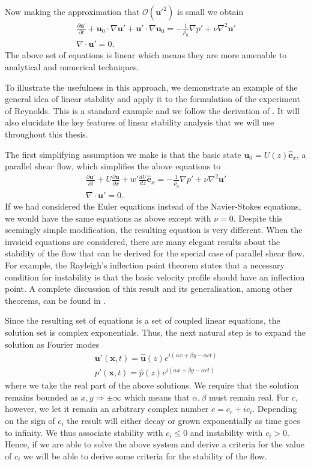 Now making the approximation that $\mathcal{O}(\bm{u}'^{2})$ is small we obtain
\begin{align}
\frac{\partial \bm{u}'}{\partial t} + \bm{u}_{0}\cdot\nabla \bm{u}' + \bm{u}'\cdot\nabla\bm{u}_{0} =  -\frac{1}{\rho_{0}}\nabla p' + \nu\nabla^{2}\bm{u}'\\
 \nabla \cdot \bm{u}'=0.
\end{align}
The above set of equations is linear which means they are more amenable to analytical and numerical techniques. 

To illustrate the usefulness in this approach, we demonstrate an example of the general idea of linear stability and apply it to the formulation of the experiment of Reynolds. This is a standard example and we follow the derivation of \cite{drazinreid}. It will also elucidate the key features of linear stability analysis that we will use throughout this thesis.

The first simplifying assumption we make is that the basic state $\bm{u}_{0}=U(z)\hat{\bm{e}}_{x}$, a parallel shear flow, which simplifies the above equations to
\begin{align}
\frac{\partial \bm{u}'}{\partial t} + U\frac{\partial \bm{u}}{\partial x} + w'\frac{dU}{dz}\hat{\bm{e}}_{x}= -\frac{1}{\rho_{0}}\nabla p' + \nu\nabla^{2} \bm{u}'\\
\nabla \cdot\bm{u}'=0.
\end{align}
If we had considered the Euler equations instead of the Navier-Stokes equations, we would have the same equations as above except with $\nu=0$. Despite this seemingly simple modification, the resulting equation is very different. When the invsicid equations are considered, there are many elegant results about the stability of the flow that can be derived for the special case of parallel shear flow. For example, the Rayleigh's inflection point theorem states that a necessary condition for instability is that the basic velocity profile should have an inflection point\cite{drazinreid}. A complete discussion of this result and its generalisation, among other theorems, can be found in \cite{drazinreid,kundu}.


Since the resulting set of equations is a set of coupled linear equations, the solution set is complex exponentials. Thus, the next natural step is to expand the solution as Fourier modes  
\begin{align}
\bm{u}'(\bm{x},t) = \hat{\bm{u}}(z)e^{i(\alpha x +\beta y -\alpha ct)}\\
p'(\bm{x},t) = \hat{p}(z)e^{i(\alpha x +\beta y -\alpha ct)}
\end{align}
where we take the real part of the above solutions. We require that the solution remains bounded as $x,y\Rightarrow\pm\infty$ which means that $\alpha,\beta$ must remain real. For $c$, however, we let it remain an arbitrary complex number $c=c_{r} + ic_{i}$. Depending on the sign of $c_{i}$ the result will either decay or grown exponentially as time goes to infinity. We thus associate stability with $c_{i}\le 0$ and instability with $c_{i}>0$. Hence, if we are able to solve the above system and derive a criteria for the value of $c_{i}$ we will be able to derive some criteria for the stability of the flow.

